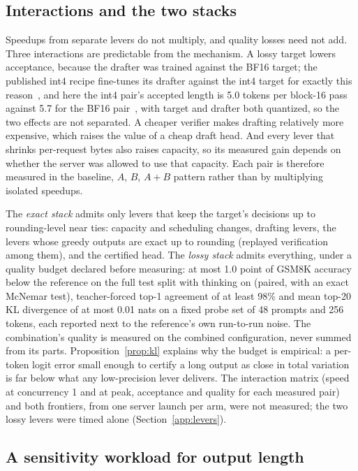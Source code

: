 \subsection{Interactions and the two stacks}\label{app:stacks}\label{sec:stack-stacks}
Speedups from separate levers do not multiply, and quality losses need not add. Three interactions are predictable from the mechanism. A lossy target lowers acceptance, because the drafter was trained against the BF16 target; the published int4 recipe fine-tunes its drafter against the int4 target for exactly this reason~\cite{nota2026}, and here the int4 pair's accepted length is 5.0 tokens per block-16 pass against 5.7 for the BF16 pair~, with target and drafter both quantized, so the two effects are not separated. A cheaper verifier makes drafting relatively more expensive, which raises the value of a cheap draft head. And every lever that shrinks per-request bytes also raises capacity, so its measured gain depends on whether the server was allowed to use that capacity. Each pair is therefore measured in the baseline, $A$, $B$, $A{+}B$ pattern rather than by multiplying isolated speedups.

The \emph{exact stack} admits only levers that keep the target's decisions up to rounding-level near ties: capacity and scheduling changes, drafting levers, the levers whose greedy outputs are exact up to rounding (replayed verification among them), and the certified head. The \emph{lossy stack} admits everything, under a quality budget declared before measuring: at most 1.0 point of GSM8K accuracy below the reference on the full test split with thinking on (paired, with an exact McNemar test), teacher-forced top-1 agreement of at least 98\% and mean top-20 KL divergence of at most 0.01 nats on a fixed probe set of 48 prompts and 256 tokens, each reported next to the reference's own run-to-run noise. The combination's quality is measured on the combined configuration, never summed from its parts. Proposition~\ref{prop:kl} explains why the budget is empirical: a per-token logit error small enough to certify a long output as close in total variation is far below what any low-precision lever delivers. The interaction matrix (speed at concurrency 1 and at peak, acceptance and quality for each measured pair) and both frontiers, from one server launch per arm, were not measured; the two lossy levers were timed alone (Section~\ref{app:levers}).

\subsection{A sensitivity workload for output length}\label{notes:sensitivity}
